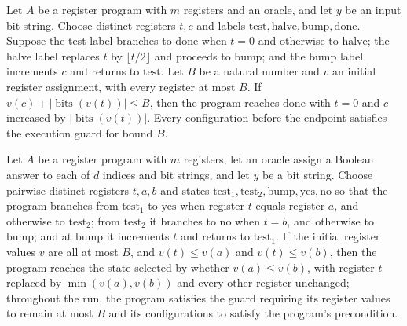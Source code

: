 \begin{theorem}
\label{Complexity.Codec.halvCount_loop}
\leanok
{}
Let $A$ be a register program with $m$ registers and an oracle, and let $y$ be an input
bit string. Choose distinct registers $t,c$ and labels $\mathrm{test},\mathrm{halve},
\mathrm{bump},\mathrm{done}$. Suppose the test label branches to $\mathrm{done}$ when
$t=0$ and otherwise to $\mathrm{halve}$; the halve label replaces $t$ by
$\lfloor t/2\rfloor$ and proceeds to $\mathrm{bump}$; and the bump label increments
$c$ and returns to $\mathrm{test}$. Let $B$ be a natural number and $v$ an initial
register assignment, with every register at most $B$. If $v(c)+|\operatorname{bits}(v(t))|
\le B$, then the program reaches $\mathrm{done}$ with $t=0$ and $c$ increased by
$|\operatorname{bits}(v(t))|$. Every configuration before the endpoint satisfies the
execution guard for bound $B$.
\end{theorem}

\begin{theorem}
\label{Complexity.Codec.le_loop}
\leanok
{}
Let $A$ be a register program with $m$ registers, let an oracle assign a Boolean answer
to each of $d$ indices and bit strings, and let $y$ be a bit string. Choose pairwise
distinct registers $t,a,b$ and states
$\mathrm{test}_1,\mathrm{test}_2,\mathrm{bump},\mathrm{yes},\mathrm{no}$ so that the
program branches from $\mathrm{test}_1$ to $\mathrm{yes}$ when register $t$ equals
register $a$, and otherwise to $\mathrm{test}_2$; from $\mathrm{test}_2$ it branches to
$\mathrm{no}$ when $t=b$, and otherwise to $\mathrm{bump}$; and at $\mathrm{bump}$ it
increments $t$ and returns to $\mathrm{test}_1$. If the initial register values $v$ are
all at most $B$, and $v(t)\le v(a)$ and $v(t)\le v(b)$, then the program reaches the
state selected by whether $v(a)\le v(b)$, with register $t$ replaced by
$\min(v(a),v(b))$ and every other register unchanged; throughout the run, the program
satisfies the guard requiring its register values to remain at most $B$ and its
configurations to satisfy the program's precondition.
\end{theorem}
